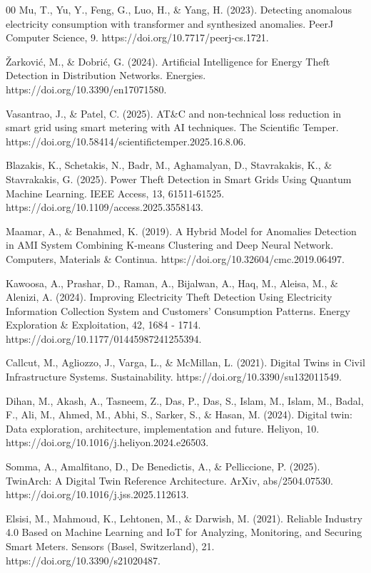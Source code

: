 \documentclass[journal]{IEEEtran}
\begin{document}
\begin{thebibliography}{00}
 Mu, T., Yu, Y., Feng, G., Luo, H., \& Yang, H. (2023). Detecting anomalous electricity consumption with transformer and synthesized anomalies. PeerJ Computer Science, 9. https://doi.org/10.7717/peerj-cs.1721.

 Žarković, M., \& Dobrić, G. (2024). Artificial Intelligence for Energy Theft Detection in Distribution Networks. Energies. https://doi.org/10.3390/en17071580.

 Vasantrao, J., \& Patel, C. (2025). AT\&C and non-technical loss reduction in smart grid using smart metering with AI techniques. The Scientific Temper. https://doi.org/10.58414/scientifictemper.2025.16.8.06.

 Blazakis, K., Schetakis, N., Badr, M., Aghamalyan, D., Stavrakakis, K., \& Stavrakakis, G. (2025). Power Theft Detection in Smart Grids Using Quantum Machine Learning. IEEE Access, 13, 61511-61525. https://doi.org/10.1109/access.2025.3558143.

 Maamar, A., \& Benahmed, K. (2019). A Hybrid Model for Anomalies Detection in AMI System Combining K-means Clustering and Deep Neural Network. Computers, Materials \& Continua. https://doi.org/10.32604/cmc.2019.06497.

 Kawoosa, A., Prashar, D., Raman, A., Bijalwan, A., Haq, M., Aleisa, M., \& Alenizi, A. (2024). Improving Electricity Theft Detection Using Electricity Information Collection System and Customers’ Consumption Patterns. Energy Exploration \& Exploitation, 42, 1684 - 1714. https://doi.org/10.1177/01445987241255394.

 Callcut, M., Agliozzo, J., Varga, L., \& McMillan, L. (2021). Digital Twins in Civil Infrastructure Systems. Sustainability. https://doi.org/10.3390/su132011549.

 Dihan, M., Akash, A., Tasneem, Z., Das, P., Das, S., Islam, M., Islam, M., Badal, F., Ali, M., Ahmed, M., Abhi, S., Sarker, S., \& Hasan, M. (2024). Digital twin: Data exploration, architecture, implementation and future. Heliyon, 10. https://doi.org/10.1016/j.heliyon.2024.e26503.

 Somma, A., Amalfitano, D., De Benedictis, A., \& Pelliccione, P. (2025). TwinArch: A Digital Twin Reference Architecture. ArXiv, abs/2504.07530. https://doi.org/10.1016/j.jss.2025.112613.

 Elsisi, M., Mahmoud, K., Lehtonen, M., \& Darwish, M. (2021). Reliable Industry 4.0 Based on Machine Learning and IoT for Analyzing, Monitoring, and Securing Smart Meters. Sensors (Basel, Switzerland), 21. https://doi.org/10.3390/s21020487.


\end{thebibliography}
\end{document}
